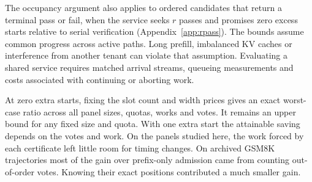 The occupancy argument also applies to ordered candidates that return a terminal pass or fail, when the service seeks $r$ passes and promises zero excess starts relative to serial verification (Appendix~\ref{app:rpass}). The bounds assume common progress across active paths. Long prefill, imbalanced KV caches or interference from another tenant can violate that assumption. Evaluating a shared service requires matched arrival streams, queueing measurements and costs associated with continuing or aborting work.

At zero extra starts, fixing the slot count and width prices gives an exact worst-case ratio across all panel sizes, quotas, works and votes. It remains an upper bound for any fixed size and quota. With one extra start the attainable saving depends on the votes and work. On the panels studied here, the work forced by each certificate left little room for timing changes. On archived GSM8K trajectories most of the gain over prefix-only admission came from counting out-of-order votes. Knowing their exact positions contributed a much smaller gain.
